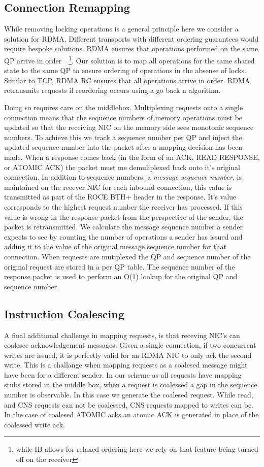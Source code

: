\subsection{Connection Remapping}

While removing locking operations is a general principle here we consider a
solution for RDMA. Different transports with different ordering guarantees would
require bespoke solutions. RDMA ensures that operations performed on the same QP
arrive in order~\cite{infiniband-spec}~\footnote{while IB allows for relaxed
ordering here we rely on that feature being turned off on the receiver}. Our
solution is to map all operations for the same shared state to the same QP to
ensure ordering of operations in the absense of locks. Similar to TCP, RDMA RC
ensures that all operations arrive in order. RDMA retransmits requests if
reordering occurs using a go back n algorithm.

Doing so requires care on the middlebox. Multiplexing requests onto a single
connection means that the sequence numbers of memory operations must be updated
so that the receiving NIC on the memory side sees monotonic sequence numbers. To
achieve this we track a sequence number per QP and inject the updated sequence
number into the packet after a mapping decision has been made. When a response
comes back (in the form of an ACK, READ RESPONSE, or ATOMIC ACK) the packet must
me demuliplexed back onto it's original connection. In addition to sequence
numbers, a \textit{message sequence number}, is maintained on the recever NIC
for each inbound connection, this value is transmitted as part of the ROCE BTH+
header in the response. It's value corresponds to the highest request number the
receiver has processed. If this value is wrong in the response packet from the
perspective of the sender, the packet is retransmitted. We calculate the message
sequence number a sender expects to see by counting the number of operations a
sender has issued and adding it to the value of the original message sequence
number for that connection. When requests are mutiplexed the QP and sequence
number of the original request are stored in a per QP table. The sequence number
of the response packet is used to perform an O(1) lookup for the original QP and
sequence number.


\subsection{Instruction Coalescing} A final additional challenge in mapping
requests, is that receving NIC's can coalesce acknowledgement messages. Given a
single connection, if two concurrent writes are issued, it is perfectly valid
for an RDMA NIC to only ack the second write. This is a challange when mapping
requests as a coalesed message might have been for a different sender. In our
scheme as all requests have mapping stubs stored in the middle box, when a
request is coalessed a gap in the sequence number is observable. In this case we
generate the coalesed request. While read, and CNS requests can not be
coalessed, CNS requests mapped to writes can be. In the case of coalesed ATOMIC
acks an atomic ACK is generated in place of the coalessed write ack.



